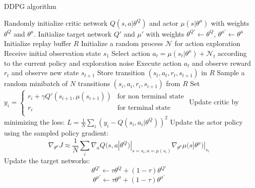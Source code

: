 \begin{algorithm}[ph!]
  \caption{DDPG algorithm }
  \label{algo:ddpg}
  \begin{algorithmic}
    \STATE Randomly initialize critic network $Q(s, a | \theta^Q)$ and actor
    $\mu(s | \theta^{\mu})$ with weights $\theta^{Q}$ and $\theta^{\mu}$.
    \STATE Initialize target network $Q'$ and $\mu'$ with weights $\theta^{Q'}
    \leftarrow \theta^{Q}$, $\theta^{\mu'} \leftarrow \theta^{\mu}$
    \STATE Initialize replay buffer $R$
      \STATE Initialize a random process $\mathcal{N}$ for action
      exploration
      \STATE Receive initial observation state $s_1$
        \STATE Select action $a_t = \mu(s_t | \theta^{\mu}) + \mathcal{N}_t$
        according to the current policy and exploration noise
        \STATE Execute action $a_t$ and observe
        reward $r_t$ and observe new state $s_{t+1}$
        \STATE Store transition $(s_t, a_t,
                r_t, s_{t+1})$ in $R$
        \STATE Sample a random minibatch of $N$ transitions
               $(s_i, a_i,
        r_i, s_{i + 1})$ from $R$
        \STATE Set $ y_i = 
            \begin{cases}
            r_i + \gamma Q'(s_{i + 1}, \mu(s_{i+1})) & \text {for non terminal state} \\
            r_i & \text{for terminal state} \\
            \end{cases} $
        \STATE Update critic by minimizing the loss:
               $L = \frac{1}{N} \sum_i (y_i -
               Q(s_i, a_i | \theta^Q))^2$
        \STATE Update the actor policy using the sampled policy gradient:
        \begin{equation*}
            \nabla_{\theta^{\mu}} J \approx
            \frac{1}{N} \sum_i
               \nabla_{a} Q(s, a | \theta^Q)|_{s = s_i, a = \mu(s_i)}
               \nabla_{\theta^\mu} \mu(s | \theta^\mu)|_{s_i}
         \end{equation*}
        \STATE Update the target networks:
          \begin{equation*}
            \theta^{Q'} \leftarrow \tau \theta^{Q} + (1 - \tau) \theta^{Q'}
          \end{equation*}
          \begin{equation*}
            \theta^{\mu'} \leftarrow \tau \theta^{\mu} +
                (1 - \tau) \theta^{\mu'}
          \end{equation*}
        \ENDFOR
    \ENDFOR
  \end{algorithmic}
\end{algorithm}



